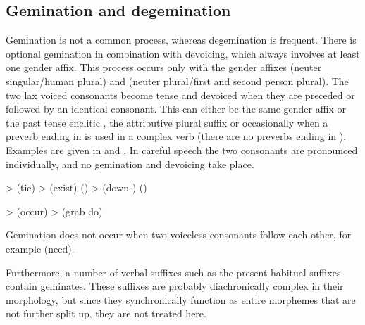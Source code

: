 \subsection{Gemination and degemination}
\label{ssec:Gemination and degemination}
Gemination is not a common process, whereas degemination is frequent. There is optional gemination in combination with devoicing, which always involves at least one gender affix. This process occurs only with the gender affixes  (neuter singular\slash human plural) and  (neuter plural\slash first and second person plural). The two lax voiced consonants become tense and devoiced when they are preceded or followed by an identical consonant. This can either be the same gender affix or the past tense enclitic , the attributive plural suffix  or occasionally when a preverb ending in  is used in a complex verb (there are no preverbs ending in ). Examples are given in  and . In careful speech the two consonants are pronounced individually, and no gemination and devoicing take place.
%
\begin{exe}
	\label{ex:d dt t phon}
	\begin{xlist}
		\ex	{} >   (tie)
		\ex	{} >   (exist) ()
		\ex	{} >   (down-) ()
	\end{xlist}

	\label{ex:bp b p phon}
	\begin{xlist}
		\ex	{} >   (occur\tsc{.pfv-pret})
		\ex	{} >   (grab do\tsc{.pfv-pret})
	\end{xlist}
\end{exe}

Gemination does not occur when two voiceless consonants follow each other, for example  (need).

Furthermore, a number of verbal suffixes such as the present habitual suffixes contain geminates. These suffixes are probably diachronically complex in their morphology, but since they synchronically function as entire morphemes that are not further split up, they are not treated here.


